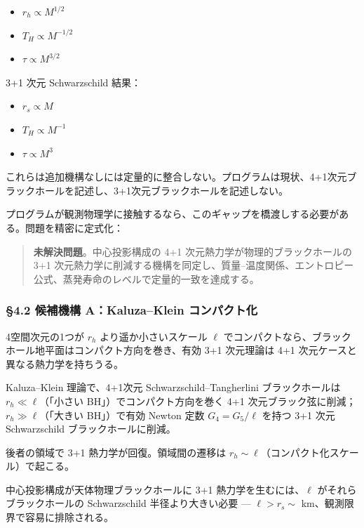 \documentclass[a4paper,11pt]{ltjsarticle}
\theoremstyle{definition}
\providecommand{\tightlist}{\setlength{\itemsep}{0pt}\setlength{\parskip}{0pt}}
\begin{document}
\begin{itemize}
\tightlist
\item
  \(r_h \propto M^{1/2}\)
\item
  \(T_H \propto M^{-1/2}\)
\item
  \(\tau \propto M^{3/2}\)
\end{itemize}

3+1 次元 Schwarzschild 結果：

\begin{itemize}
\tightlist
\item
  \(r_s \propto M\)
\item
  \(T_H \propto M^{-1}\)
\item
  \(\tau \propto M^3\)
\end{itemize}

これらは追加機構なしには定量的に整合しない。プログラムは現状、4+1次元ブラックホールを記述し、3+1次元ブラックホールを記述しない。

プログラムが観測物理学に接触するなら、このギャップを橋渡しする必要がある。問題を精密に定式化：

\begin{quote}
\textbf{未解決問題}。中心投影構成の 4+1
次元熱力学が物理的ブラックホールの 3+1
次元熱力学に削減する機構を同定し、質量--温度関係、エントロピー公式、蒸発寿命のレベルで定量的一致を達成する。
\end{quote}

\subsubsection{§4.2 候補機構 A：Kaluza--Klein
コンパクト化}\label{ux5019ux88dcux6a5fux69cb-akaluzaklein-ux30b3ux30f3ux30d1ux30afux30c8ux5316}

4空間次元の1つが \(r_h\) より遥か小さいスケール \(\ell\)
でコンパクトなら、ブラックホール地平面はコンパクト方向を巻き、有効 3+1
次元理論は 4+1 次元ケースと異なる熱力学を持ちうる。

Kaluza--Klein 理論で、4+1次元 Schwarzschild--Tangherlini
ブラックホールは \(r_h \ll \ell\)（「小さい BH」）でコンパクト方向を巻く
4+1 次元ブラック弦に削減；\(r_h \gg \ell\)（「大きい BH」）で有効 Newton
定数 \(G_4 = G_5/\ell\) を持つ 3+1 次元 Schwarzschild
ブラックホールに削減。

後者の領域で 3+1 熱力学が回復。領域間の遷移は
\(r_h \sim \ell\)（コンパクト化スケール）で起こる。

中心投影構成が天体物理ブラックホールに 3+1 熱力学を生むには、\(\ell\)
がそれらブラックホールの Schwarzschild 半径より大きい必要 ---
\(\ell > r_s \sim\) km、観測限界で容易に排除される。
\end{document}
